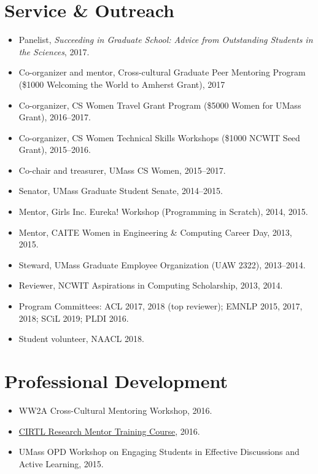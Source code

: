 \documentclass{resume}
\begin{document}
\section{Service \& Outreach}
\begin{itemize}
\item Panelist, \emph{Succeeding in Graduate School: Advice from Outstanding Students in the Sciences}, 2017. 
\item Co-organizer and mentor, Cross-cultural Graduate Peer Mentoring Program (\$1000 Welcoming the World to Amherst Grant), 2017
\item Co-organizer, CS Women Travel Grant Program (\$5000 Women for UMass Grant), 2016--2017.
\item Co-organizer, CS Women Technical Skills Workshops (\$1000 NCWIT Seed Grant), 2015--2016.
\item Co-chair and treasurer, UMass CS Women, 2015--2017.
\item Senator, UMass Graduate Student Senate, 2014--2015.
\item Mentor, Girls Inc. Eureka! Workshop (Programming in Scratch), 2014, 2015.
\item Mentor, CAITE Women in Engineering \& Computing Career Day, 2013, 2015.
\item Steward, UMass Graduate Employee Organization (UAW 2322), 2013--2014.
\item Reviewer, NCWIT Aspirations in Computing Scholarship, 2013, 2014.
\item Program Committees: ACL 2017, 2018 (top reviewer); EMNLP 2015, 2017, 2018; SCiL 2019; PLDI 2016.
\item Student volunteer, NAACL 2018.
\end{itemize}

\section{Professional Development}
\begin{itemize}
\item WW2A Cross-Cultural Mentoring Workshop, 2016.
\item \href{https://www.cirtl.net/courses/261}{CIRTL Research Mentor Training Course}, 2016.
\item UMass OPD Workshop on Engaging Students in Effective Discussions and Active Learning, 2015.
\end{itemize}
\end{document}
